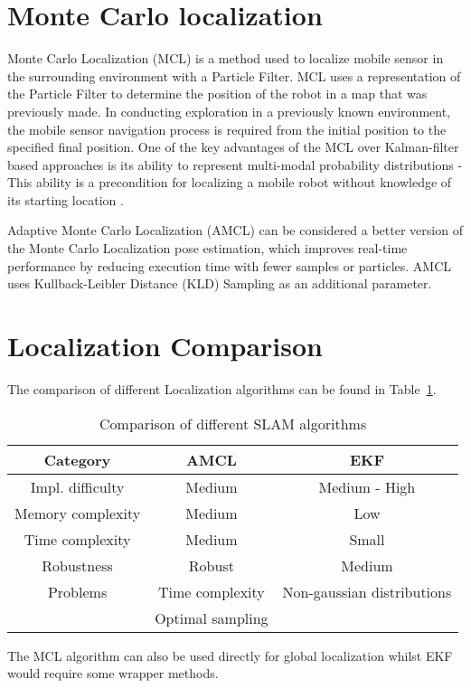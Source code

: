 \documentclass[12pt, a4paper, onecolumn]{article}
\begin{document}
\section{Monte Carlo localization}

Monte Carlo Localization (MCL) is a method used to localize mobile sensor in the surrounding environment with a Particle Filter\cite{Overview2021}. 
MCL uses a representation of the Particle Filter to determine the position of the robot in a map that was previously made.
In conducting exploration in a previously known environment, the mobile sensor navigation process is required from the initial position to the specified final position\cite{MCL99}. 
One of the key advantages of the MCL over Kalman-filter based approaches is its ability to represent multi-modal probability distributions - This ability is a precondition for localizing a mobile robot without knowledge of its starting location \cite{MCL99}.

Adaptive Monte Carlo Localization (AMCL) can be considered a better version of the Monte Carlo Localization pose estimation, which improves real-time performance by reducing execution time with fewer samples or particles. 
AMCL uses Kullback-Leibler Distance (KLD) Sampling as an additional parameter. \cite{AMCL19}

\section{Localization Comparison}
The comparison of different Localization algorithms can be found in Table~\ref{tab:slam_algorithms}.
\begin{table}[h!]
  \begin{center}
    \begin{tabular}[c]{|c || c c |}
      \hline
       Category                &  AMCL          & EKF                 \\
      \hline
      Impl. difficulty &  Medium        & Medium - High       \\
      \hline
      Memory complexity&  Medium        & Low                 \\
      \hline
      Time complexity  &  Medium        & Small               \\
      \hline
      Robustness       &  Robust        & Medium              \\
      \hline
      Problems         & Time complexity & Non-gaussian distributions \\
                       &   Optimal sampling &  \\
      \hline
    \end{tabular}
  \end{center}
  \caption{Comparison of different SLAM algorithms}
  \label{tab:slam_algorithms}
\end{table}
The MCL algorithm can also be used directly for global localization whilst EKF would require some wrapper methods.
\end{document}
